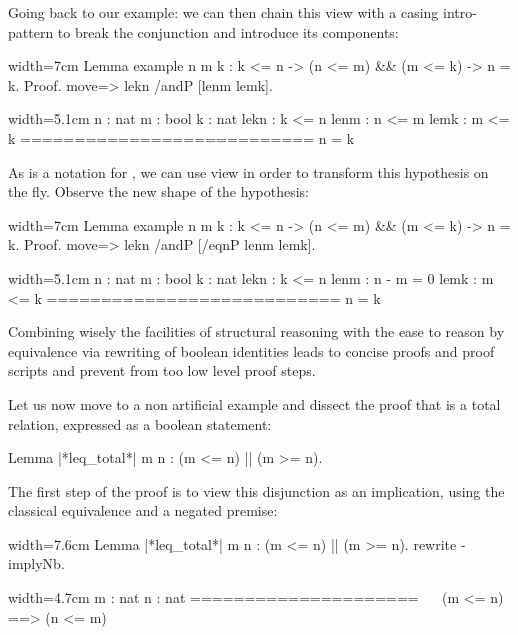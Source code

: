 
Going back to  our example: we can then chain this view with a casing
intro-pattern to break the conjunction and introduce its components:

\begin{coq}{}{width=7cm}
Lemma example n m k :
  k <= n -> (n <= m) && (m <= k) -> n = k.
Proof.
move=> lekn /andP [lenm lemk].
\end{coq}
\begin{coqout}{}{width=5.1cm}
n : nat
m : bool
k : nat
lekn : k <= n
lenm : n <= m
lemk : m <= k
===========================
n = k
\end{coqout}

As  is a notation for , we can use view
 in order to transform this hypothesis on the fly. Observe the
new shape of the  hypothesis:

\begin{coq}{}{width=7cm}
Lemma example n m k :
  k <= n -> (n <= m) && (m <= k) -> n = k.
Proof.
move=> lekn /andP [/eqnP lenm lemk].
\end{coq}
\begin{coqout}{}{width=5.1cm}
n : nat
m : bool
k : nat
lekn : k <= n
lenm : n - m = 0
lemk : m <= k
===========================
n = k
\end{coqout}

Combining wisely the facilities of  structural reasoning with
the ease to reason by equivalence via rewriting of boolean identities
leads to concise proofs and proof scripts and prevent from too low
level proof steps. 

Let us now move to a non artificial example and dissect the proof that
\C{(_ <= _)} is a total relation, expressed as a boolean statement:

\begin{coq}{}{}
Lemma |*leq_total*| m n : (m <= n) || (m >= n).
\end{coq}

The first step of the proof is to view this disjunction as an
implication, using the classical equivalence and a negated premise:

\begin{coq}{}{width=7.6cm}
Lemma |*leq_total*| m n : (m <= n) || (m >= n).
rewrite -implyNb.
\end{coq}
\begin{coqout}{}{width=4.7cm}
m : nat
n : nat
=====================
~~ (m <= n) ==> (n <= m)
\end{coqout}

